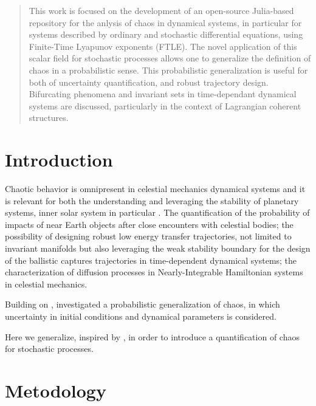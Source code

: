 \documentclass{juliacon}
\begin{document}


\maketitle

\begin{abstract}

This work is focused on the development of an open-source Julia-based repository for the anlysis of chaos in dynamical systems, 
in particular for systems described by ordinary and stochastic differential equations, using Finite-Time Lyapunov exponents (FTLE).
The novel application of this scalar field for stochastic processes allows one to generalize the definition of chaos in a probabilistic sense.
This probabilistic generalization is useful for both of uncertainty quantification, and robust trajectory design.
Bifurcating phenomena and invariant sets in time-dependant dynamical systems are discussed, particularly in the context of Lagrangian coherent structures.

\end{abstract}

\section{Introduction}

Chaotic behavior is omnipresent in celestial mechanics dynamical systems and it is relevant for both the understanding and 
leveraging the stability of planetary systems, inner solar system in particular \cite{celletti}. 
The quantification of the probability of impacts of near Earth objects after close encounters with celestial bodies; 
the possibility of designing robust low energy transfer trajectories, not limited to invariant manifolds but also leveraging the 
weak stability boundary for the design of the ballistic captures trajectories in time-dependent dynamical systems; 
the characterization of diffusion processes in Nearly-Integrable Hamiltonian systems in celestial mechanics. 

Building on \cite{Szebehely82}, \cite{ManziAAS2020, VasileManzi} investigated a probabilistic generalization of chaos, in which uncertainty in initial conditions and dynamical parameters is considered.

Here we generalize, inspired by \cite{Balibrea-Iniesta}, in order to introduce a quantification of chaos for stochastic processes.

\section{Metodology}
\end{document}
